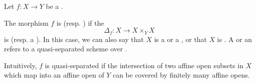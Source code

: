 \begin{definition} \label{definition:quasi_separated_morphism_of_schemes_and_separated_morphism_of_schemes}
    Let $f : X \to Y$ be a .

        The morphism $f$ is  (resp. ) if the 
        \[
        \Delta_f : X \to X \times_Y X
        \]
        is  (resp. a ). In this case, we can also say that $X$ is a  or a , or that $X$ is . A  or an  refers to a quasi-separated scheme over . 


        Intuitively, $f$ is quasi-separated if the intersection of two affine open subsets in $X$ which map into an affine open of $Y$ can be covered by finitely many affine opens.


\end{definition}